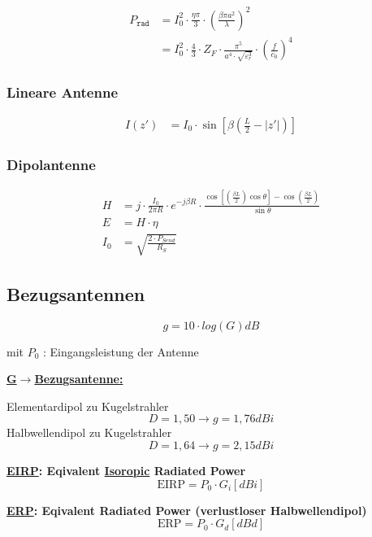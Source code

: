 \begin{align*}
    P_\texttt{rad} & = I_0^2\cdot\frac{\eta\pi}{3}\cdot\left(\frac{\beta\pi a^2}{\lambda}\right)^2                                      \\
                   & = I_0^2\cdot\frac{4}{3}\cdot Z_F\cdot\frac{\pi^5}{a^4\cdot\sqrt{\varepsilon_r^3}}\cdot\left(\frac{f}{c_0}\right)^4
\end{align*}

\subsubsection{Lineare Antenne}
\begin{align*}
    I(z') & = I_0\cdot\sin\left[\beta\left(\frac{L}{2}-|z'|\right)\right]
\end{align*}

\subsubsection{Dipolantenne}
\begin{align*}
    H   & = j\cdot\frac{I_0}{2\pi R}\cdot e^{-j\beta R}\cdot\frac{\cos\left[\left(\frac{\beta L}{2}\right)\cos\theta\right]-\cos\left(\frac{\beta L}{2}\right)}{\sin\theta} \\
    E   & = H\cdot\eta                                                                                                                                                      \\
    I_0 & = \sqrt{\frac{2\cdot P_{Send}}{R_S}}
\end{align*}

\subsection{Bezugsantennen}
\[
    \boxed{g = 10 \cdot log(G)\si{dB}}
\]

mit $P_0$ : Eingangsleistung der Antenne

\begin{description}
    \item \textbf{\underline{G$\rightarrow$Bezugsantenne:}}

          Elementardipol  zu Kugelstrahler \[D = 1,50 \rightarrow g = 1,76\si{dBi}\]
          Halbwellendipol zu Kugelstrahler \[D = 1,64 \rightarrow g = 2,15\si{dBi}\]

    \item \textbf{\underline{EIRP}: Eqivalent \underline{Isoropic} Radiated Power}
          \[
              \text{EIRP} = P_0 \cdot G_i [\si{dBi}]
          \]

    \item \textbf{\underline{ERP}: Eqivalent Radiated Power (verlustloser Halbwellendipol)}
          \[
              \text{ERP} = P_0 \cdot G_d [\si{dBd}]
          \]
\end{description}

